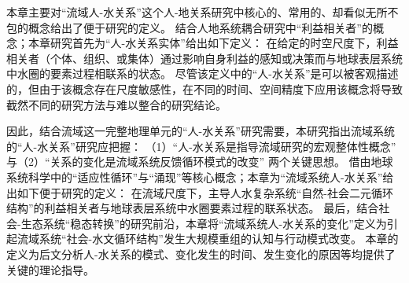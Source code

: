 本章主要对“流域人-水关系”这个人-地关系研究中核心的、常用的、却看似无所不包的概念给出了便于研究的定义。
结合人地系统耦合研究中“利益相关者”的概念；本章研究首先为“人-水关系实体”给出如下定义：
在给定的时空尺度下，利益相关者（个体、组织、或集体）通过影响自身利益的感知或决策而与地球表层系统中水圈的要素过程相联系的状态。
尽管该定义中的“人-水关系”是可以被客观描述的，但由于该概念存在尺度敏感性，在不同的时间、空间精度下应用该概念将导致截然不同的研究方法与难以整合的研究结论。

因此，结合流域这一完整地理单元的“人-水关系”研究需要，本研究指出流域系统的“人-水关系”研究应把握：
（1）“人-水关系是指导流域研究的宏观整体性概念”
与（2）“关系的变化是流域系统反馈循环模式的改变”
两个关键思想。
借由地球系统科学中的“适应性循环”与“涌现”等核心概念；本章为“流域系统人-水关系”给出如下便于研究的定义：
在流域尺度下，主导人水复杂系统“自然-社会二元循环结构”的利益相关者与地球表层系统中水圈要素过程的联系状态。
最后，结合社会-生态系统“稳态转换”的研究前沿，本章将“流域系统人-水关系的变化”定义为引起流域系统“社会-水文循环结构”发生大规模重组的认知与行动模式改变。
本章的定义为后文分析人-水关系的模式、变化发生的时间、发生变化的原因等均提供了关键的理论指导。

